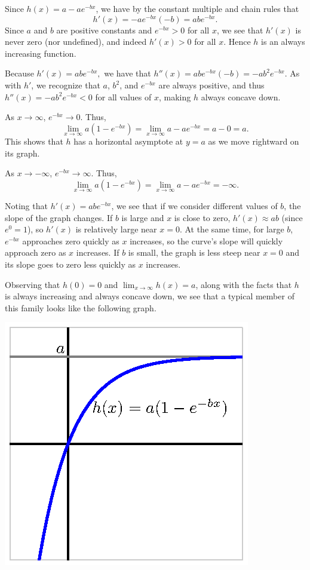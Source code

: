 \begin{activitySolution}
\ba
  \item Since $h(x) = a - ae^{-bx}$, we have by the constant multiple and chain rules that
  $$h'(x) = -ae^{-bx}(-b) = abe^{-bx}.$$
  Since $a$ and $b$ are positive constants and $e^{-bx} > 0$ for all $x$, we see that $h'(x)$ is never zero (nor undefined), and indeed $h'(x) > 0$ for all $x$.  Hence $h$ is an always increasing function.
  \item Because $h'(x) = abe^{-bx},$ we have that $h''(x) = abe^{-bx}(-b) = -ab^2e^{-bx}$.  As with $h'$, we recognize that $a$, $b^2$, and $e^{-bx}$ are always positive, and thus $h''(x) = -ab^2e^{-bx} < 0$ for all values of $x$, making $h$ always concave down.
  \item As $x \to \infty$, $e^{-bx} \to 0$.  Thus,
  $$\lim_{x \to \infty} a(1-e^{-bx}) = \lim_{x \to \infty} a - ae^{-bx} = a - 0 = a.$$
  This shows that $h$ has a horizontal asymptote at $y = a$ as we move rightward on its graph.
  
  As $x \to -\infty$, $e^{-bx} \to \infty$.  Thus, 
  $$\lim_{x \to \infty} a(1-e^{-bx}) = \lim_{x \to \infty} a - ae^{-bx} = -\infty.$$
  \item Noting that $h'(x) = abe^{-bx}$, we see that if we consider different values of $b$, the slope of the graph changes.  If $b$ is large and $x$ is close to zero, $h'(x) \approx ab$ (since $e^0 = 1$), so $h'(x)$ is relatively large near $x = 0$.  At the same time, for large $b$, $e^{-bx}$ approaches zero quickly as $x$ increases, so the curve's slope will quickly approach zero as $x$ increases.  If $b$ is small, the graph is less steep near $x = 0$ and its slope goes to zero less quickly as $x$ increases.
  \item Observing that $h(0) = 0$ and $\lim_{x \to \infty} h(x) = a$, along with the facts that $h$ is always increasing and always concave down, we see that a typical member of this family looks like the following graph.
    \begin{center}
  	\includegraphics{figures/3_2_Act2Soln.eps}
  \end{center}	
\ea
\end{activitySolution}
\aftera